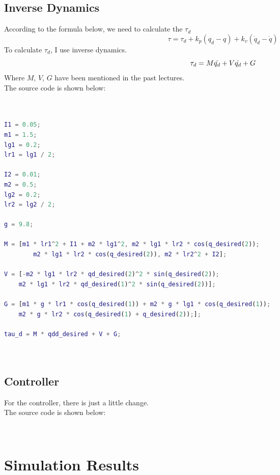 \documentclass{article}
\begin{document}
\subsection*{Inverse Dynamics}
According to the formula below, we need to calculate the $\tau_d$\\
    \begin{equation}
        \tau=\tau_d+k_p(q_d-q)+k_v(\dot{q}_d-\dot{q})
    \end{equation}
To calculate $\tau_d$, I use inverse dynamics.\\ 
\begin{equation}
    \tau_d = M \Ddot{q_d} + V \dot{q_d} + G
\end{equation}
Where $M$, $V$, $G$ have been mentioned in the past lectures.\\
The source code is shown below:
\begin{lstlisting}[language=Matlab, basicstyle=\small\ttfamily]


I1 = 0.05;
m1 = 1.5;
lg1 = 0.2;
lr1 = lg1 / 2;

I2 = 0.01;
m2 = 0.5;
lg2 = 0.2;
lr2 = lg2 / 2;

g = 9.8;

M = [m1 * lr1^2 + I1 + m2 * lg1^2, m2 * lg1 * lr2 * cos(q_desired(2));
        m2 * lg1 * lr2 * cos(q_desired(2)), m2 * lr2^2 + I2];

V = [-m2 * lg1 * lr2 * qd_desired(2)^2 * sin(q_desired(2));
    m2 * lg1 * lr2 * qd_desired(1)^2 * sin(q_desired(2))];

G = [m1 * g * lr1 * cos(q_desired(1)) + m2 * g * lg1 * cos(q_desired(1));
    m2 * g * lr2 * cos(q_desired(1) + q_desired(2));];

tau_d = M * qdd_desired + V + G;

    
\end{lstlisting}

\subsection*{Controller}
For the controller, there is just a little change.\\

The source code is shown below:\\

\begin{lstlisting}[language=Matlab, basicstyle=\small\ttfamily]
    
\end{lstlisting}

\section{Simulation Results}
\end{document}
